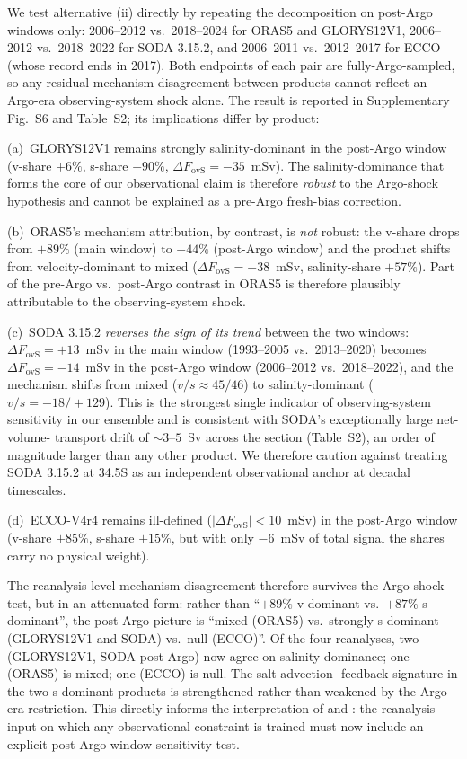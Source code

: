 \documentclass[12pt,a4paper]{article}
\newcommand{\Fovs}{F_\mathrm{ovS}}
\begin{document}
We test alternative (ii) directly by repeating the decomposition
on post-Argo windows only: 2006--2012 vs.\ 2018--2024 for ORAS5
and GLORYS12V1, 2006--2012 vs.\ 2018--2022 for SODA 3.15.2, and
2006--2011 vs.\ 2012--2017 for ECCO (whose record ends in 2017).
Both endpoints of each pair are fully-Argo-sampled, so any
residual mechanism disagreement between products cannot reflect an
Argo-era observing-system shock alone. The result is reported in
Supplementary Fig.~S6 and Table~S2; its implications differ by
product:

(a)~GLORYS12V1 remains strongly salinity-dominant in the post-Argo
window (v-share $+6\%$, s-share $+90\%$, $\Delta\Fovs = -35$~mSv).
The salinity-dominance that forms the core of our observational
claim is therefore \emph{robust} to the Argo-shock hypothesis and
cannot be explained as a pre-Argo fresh-bias correction.

(b)~ORAS5's mechanism attribution, by contrast, is \emph{not}
robust: the v-share drops from $+89\%$ (main window) to $+44\%$
(post-Argo window) and the product shifts from velocity-dominant
to mixed ($\Delta\Fovs = -38$~mSv, salinity-share $+57\%$). Part
of the pre-Argo vs.\ post-Argo contrast in ORAS5 is therefore
plausibly attributable to the observing-system shock.

(c)~SODA 3.15.2 \emph{reverses the sign of its trend} between
the two windows: $\Delta\Fovs = +13$~mSv in the main window
(1993--2005 vs.\ 2013--2020) becomes $\Delta\Fovs = -14$~mSv in
the post-Argo window (2006--2012 vs.\ 2018--2022), and the
mechanism shifts from mixed ($v/s \approx 45/46$) to
salinity-dominant ($v/s = -18/+129$). This is the strongest
single indicator of observing-system sensitivity in our ensemble
and is consistent with SODA's exceptionally large net-volume-%
transport drift of $\sim 3$--$5$~Sv across the section
(Table~S2), an order of magnitude larger than any other product.
We therefore caution against treating SODA 3.15.2 at 34.5\textdegree S
as an independent observational anchor at decadal timescales.

(d)~ECCO-V4r4 remains ill-defined ($|\Delta\Fovs| < 10$~mSv) in
the post-Argo window (v-share $+85\%$, s-share $+15\%$, but with
only $-6$~mSv of total signal the shares carry no physical
weight).

The reanalysis-level mechanism disagreement therefore survives
the Argo-shock test, but in an attenuated form: rather than
``$+89\%$ v-dominant vs.\ $+87\%$ s-dominant'', the post-Argo
picture is ``mixed (ORAS5) vs.\ strongly s-dominant (GLORYS12V1
and SODA) vs.\ null (ECCO)''. Of the four reanalyses, two
(GLORYS12V1, SODA post-Argo) now agree on salinity-dominance;
one (ORAS5) is mixed; one (ECCO) is null. The salt-advection-%
feedback signature in the two s-dominant products is strengthened
rather than weakened by the Argo-era restriction. This directly
informs the interpretation of \citet{Portmann2026} and
\citet{Dong2024}: the reanalysis input on which any observational
constraint is trained must now include an explicit post-Argo-window
sensitivity test.
\end{document}

